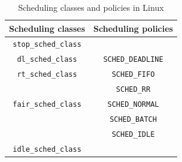 \begin{table}[t]
\centering
\begin{tabular}{|c|c|}
\hline
\textbf{Scheduling classes} & \textbf{Scheduling policies}\\
\hline
\texttt{stop\_sched\_class} &\\
\hline
\texttt{dl\_sched\_class}   & \texttt{SCHED\_DEADLINE}\\
\hline
\texttt{rt\_sched\_class}   & \texttt{SCHED\_FIFO} \\
                   		   & \texttt{SCHED\_RR}\\
\hline
\texttt{fair\_sched\_class} & \texttt{SCHED\_NORMAL}\\
                   & \texttt{SCHED\_BATCH}\\
                   & \texttt{SCHED\_IDLE}\\
\hline
\texttt{idle\_sched\_class} &\\          
\hline
\end{tabular}
\caption{Scheduling classes and policies in Linux}\label{tab:classes}
\label{tab:sched_classes}
\end{table}
